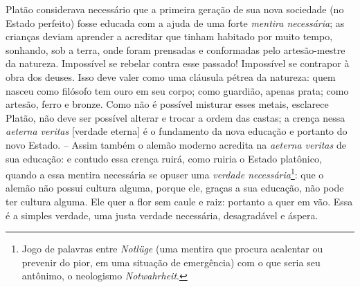     Platão considerava necessário que a primeira geração de sua nova
    sociedade (no Estado perfeito) fosse educada com a ajuda de uma
    forte \emph{mentira necessária}; as crianças deviam aprender a
    acreditar que tinham habitado por muito tempo, sonhando, sob a
    terra, onde foram prensadas e conformadas pelo artesão-mestre da
    natureza. Impossível se rebelar contra esse passado! Impossível se
    contrapor à obra dos deuses. Isso deve valer como uma cláusula
    pétrea da natureza: quem nasceu como filósofo tem ouro em seu corpo;
    como guardião, apenas prata; como artesão, ferro e bronze. Como não
    é possível misturar esses metais, esclarece Platão, não deve ser
    possível alterar e trocar a ordem das castas; a crença nessa
    \emph{aeterna veritas} {[}verdade eterna{]} é o fundamento da nova
    educação e portanto do novo Estado. -- Assim também o alemão moderno
    acredita na \emph{aeterna veritas} de sua educação: e contudo essa
    crença ruirá, como ruiria o Estado platônico, quando a essa mentira
    necessária se opuser uma \emph{verdade necessária}\footnote{Jogo de
      palavras entre \emph{Notlüge} (uma mentira que procura acalentar
      ou prevenir do pior, em uma situação de emergência) com o que
      seria seu antônimo, o neologismo \emph{Notwahrheit}.}: que o
    alemão não possui cultura alguma, porque ele, graças a sua educação,
    não pode ter cultura alguma. Ele quer a flor sem caule e raiz:
    portanto a quer em vão. Essa é a simples verdade, uma justa verdade
    necessária, desagradável e áspera.

